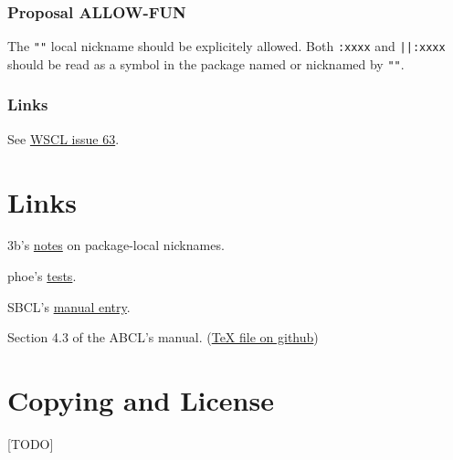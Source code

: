 \documentclass[11pt]{article}
\begin{document}
\subsubsection{Proposal ALLOW-FUN}
\label{sec:org10a06fe}
The \texttt{""} local nickname should be explicitely allowed. Both \texttt{:xxxx} and \texttt{||:xxxx}
should be read as a symbol in the package named or nicknamed by \texttt{""}.
\subsubsection{Links}
\label{sec:orga48af14}
See \href{https://github.com/s-expressionists/wscl/issues/63}{WSCL issue 63}.
\section{Links}
\label{sec:org8b9f307}
3b's \href{https://github.com/3b/package-local-nicknames/blob/master/docs.org}{notes} on package-local nicknames.

phoe's \href{https://github.com/phoe/trivial-package-local-nicknames}{tests}.

SBCL's \href{https://www.sbcl.org/manual/\#Package\_002dLocal-Nicknames}{manual entry}.

Section 4.3 of the ABCL's manual. (\href{https://github.com/armedbear/abcl/blob/master/doc/manual/abcl.tex\#L1249}{\TeX{} file on github})
\section{Copying and License}
\label{sec:orgaebe5a7}
[TODO]
\end{document}
